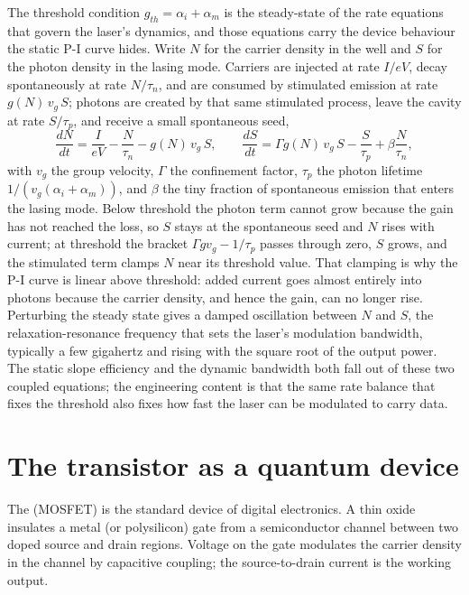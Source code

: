 \begin{mastery}
The threshold condition $g_{th} = \alpha_i + \alpha_m$ is the
steady-state of the rate equations that govern the laser's dynamics, and
those equations carry the device behaviour the static P-I curve hides.
Write $N$ for the carrier density in the well and $S$ for the photon
density in the lasing mode. Carriers are injected at rate $I/eV$, decay
spontaneously at rate $N/\tau_n$, and are consumed by stimulated emission
at rate $g(N)\,v_g\,S$; photons are created by that same stimulated
process, leave the cavity at rate $S/\tau_p$, and receive a small
spontaneous seed,
\[
\frac{dN}{dt} = \frac{I}{eV} - \frac{N}{\tau_n} - g(N)\,v_g\,S,
\qquad
\frac{dS}{dt} = \Gamma g(N)\,v_g\,S - \frac{S}{\tau_p}
              + \beta\frac{N}{\tau_n},
\]
with $v_g$ the group velocity, $\Gamma$ the confinement factor, $\tau_p$
the photon lifetime $1/(v_g(\alpha_i+\alpha_m))$, and $\beta$ the tiny
fraction of spontaneous emission that enters the lasing mode. Below
threshold the photon term cannot grow because the gain has not reached
the loss, so $S$ stays at the spontaneous seed and $N$ rises with current;
at threshold the bracket $\Gamma g v_g - 1/\tau_p$ passes through zero, $S$
grows, and the stimulated term clamps $N$ near its threshold value. That
clamping is why the P-I curve is linear above threshold: added current
goes almost entirely into photons because the carrier density, and hence
the gain, can no longer rise. Perturbing the steady state gives a damped
oscillation between $N$ and $S$, the relaxation-resonance frequency that
sets the laser's modulation bandwidth, typically a few gigahertz and
rising with the square root of the output power. The static slope
efficiency and the dynamic bandwidth both fall out of these two coupled
equations; the engineering content is that the same rate balance that
fixes the threshold also fixes how fast the laser can be modulated to
carry data.
\end{mastery}

\section{The transistor as a quantum device}

The 
(MOSFET) is the standard device of digital electronics. A thin oxide
insulates a metal (or polysilicon) gate from a semiconductor channel
between two doped source and drain regions. Voltage on the gate
modulates the carrier density in the channel by capacitive coupling;
the source-to-drain current is the working output.

